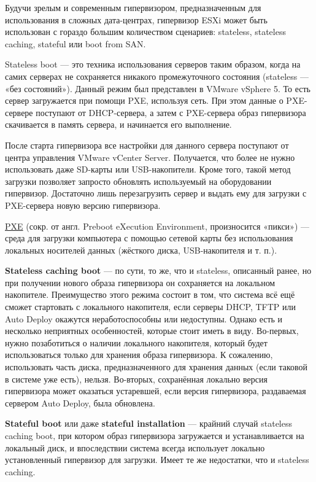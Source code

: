 \documentclass[14pt, a4paper]{article}
\begin{document}
Будучи зрелым и современным гипервизором, предназначенным для использования в сложных
дата-центрах, гипервизор ESXi может быть использован с гораздо большим количеством сценариев:
stateless, stateless caching, stateful или boot from SAN.

Stateless boot — это техника использования серверов таким образом, когда на самих серверах не
сохраняется никакого промежуточного состояния (stateless — «без состояний»). Данный режим был
представлен в VMware vSphere 5. То есть сервер загружается при помощи PXE, используя сеть. При
этом данные о PXE-сервере поступают от DHCP-сервера, а затем с PXE-сервера образ гипервизора
скачивается в память сервера, и начинается его выполнение.

После старта гипервизора все настройки для данного сервера поступают от центра управления
VMware vCenter Server. Получается, что более не нужно использовать даже SD-карты или
USB-накопители. Кроме того, такой метод загрузки позволяет запросто обновлять используемый на
оборудовании гипервизор. Достаточно лишь перезагрузить сервер и выдать ему для загрузки с
PXE-сервера новую версию гипервизора.

\href{https://ru.wikipedia.org/wiki/PXE}{PXE} (сокр. от англ. Preboot eXecution Environment, произносится «пикси») — среда для загрузки
компьютера с помощью сетевой карты без использования локальных носителей данных (жёсткого
диска, USB-накопителя и т. п.).

\textbf{Stateless caching boot} — по сути, то же, что и stateless, описанный ранее, но при получении нового
образа гипервизора он сохраняется на локальном накопителе. Преимущество этого режима состоит в
том, что система всё ещё сможет стартовать с локального накопителя, если серверы DHCP, TFTP или
Auto Deploy окажутся неработоспособны или недоступны. Однако есть и несколько неприятных
особенностей, которые стоит иметь в виду. Во-первых, нужно позаботиться о наличии локального
накопителя, который будет использоваться только для хранения образа гипервизора. К сожалению,
использовать часть диска, предназначенного для хранения данных (если таковой в системе уже есть),
нельзя. Во-вторых, сохранённая локально версия гипервизора может оказаться устаревшей, если
версия гипервизора, раздаваемая сервером Auto Deploy, была обновлена.

\textbf{Stateful boot} или даже \textbf{stateful installation} — крайний случай stateless caching boot, при котором
образ гипервизора загружается и устанавливается на локальный диск, и впоследствии система всегда
использует локально установленный гипервизор для загрузки. Имеет те же недостатки, что и stateless
caching.
\end{document}
